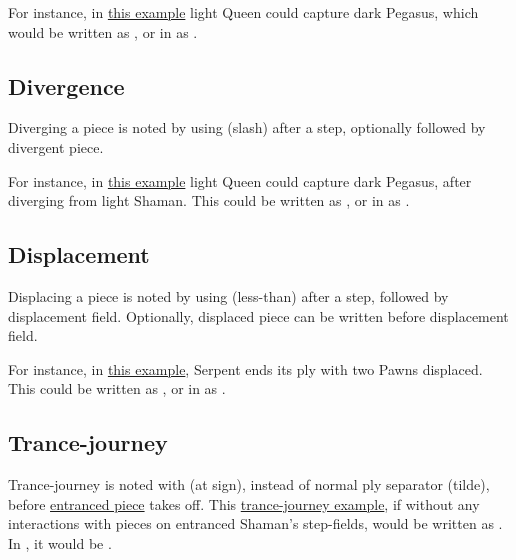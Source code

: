 For instance, in \hyperref[fig:scn_mv_07_wave_is_transparent]{this example} light Queen
could capture dark Pegasus, which would be written as \newline
{}, or in  as \newline
{}.

\subsection*{Divergence}
\label{sec:Appendix/Notation/Divergence}

Diverging a piece is noted by using \alg{/} (slash) after a step, optionally followed
by divergent piece.

For instance, in \hyperref[fig:scn_cot_09_own_shaman_is_divergent_init]{this example}
light Queen could capture dark Pegasus, after diverging from light Shaman.
This could be written as , or in  as .

\subsection*{Displacement}
\label{sec:Appendix/Notation/Displacement}

Displacing a piece is noted by using \alg{<} (less-than) after a step, followed by
displacement field. Optionally, displaced piece can be written before displacement
field.

For instance, in \hyperref[fig:scn_tr_19_displacement_init]{this example}, Serpent ends
its ply with two Pawns displaced. This could be written as ,
or in  as \newline
{}.

\subsection*{Trance-journey}
\label{sec:Appendix/Notation/Trance-journey}

Trance-journey is noted with  (at sign), instead of normal ply separator \alg{\~{}}
(tilde), before \hyperref[fig:scn_cot_41_entrancement_init]{entranced piece} takes off. This
\hyperref[fig:scn_cot_56_light_light_shaman_interaction_start]{trance-journey example},
if without any interactions with pieces on entranced Shaman's step-fields, would be written
as . In , it would be .

